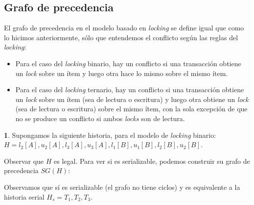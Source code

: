 \documentclass[english,titlepage]{article}
\theoremstyle{definition}
\theoremstyle{definition}
\newtheorem{example}[thm]{\protect\examplename}
\providecommand{\examplename}{Ejemplo}
\begin{document}
\subsection{Grafo de precedencia}

El grafo de precedencia en el modelo basado en \emph{locking} se define igual
que como lo hicimos anteriormente, sólo que entendemos el conflicto según las
reglas del \emph{locking}:

\begin{itemize}
    \item Para el caso del \emph{locking} binario, hay un conflicto si una
        transacción obtiene un \emph{lock} sobre un ítem y luego otra hace lo
        mismo sobre el mismo ítem.
    \item Para el caso del \emph{locking} ternario, hay un conflicto si una
        transacción obtiene un \emph{lock} sobre un ítem (sea de lectura o
        escritura) y luego otra obtiene un \emph{lock} (sea de lectura o
        escritura) sobre el mismo ítem, con la sola excepción de que no se
        produce un conflicto si ambos \emph{locks} son de lectura.
\end{itemize}


\begin{example}
Supongamos la siguiente historia, para el modelo de \emph{locking} binario:
$H = l_2[A], u_2[A], l_3[A], u_3[A], l_1[B], u_1[B], l_2[B], u_2[B]$.

Observar que $H$ es legal. Para ver si es serializable, podemos construir su
grafo de precedencia $SG(H)$: 

\vspace{10pt}


\vspace{10pt}

Observamos que sí es serializable (el grafo no tiene ciclos) y es equivalente
a la historia serial $H_s = T_1, T_2, T_3$.
\end{example}
\end{document}
